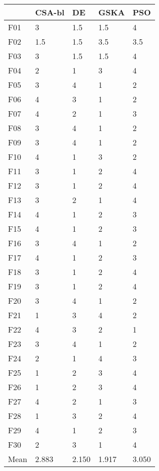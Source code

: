 \begin{tabular}{lllll}
\toprule
{} & CSA-bl &     DE &   GSKA &    PSO \\
\midrule
F01  &      3 &    1.5 &    1.5 &      4 \\
F02  &    1.5 &    1.5 &    3.5 &    3.5 \\
F03  &      3 &    1.5 &    1.5 &      4 \\
F04  &      2 &      1 &      3 &      4 \\
F05  &      3 &      4 &      1 &      2 \\
F06  &      4 &      3 &      1 &      2 \\
F07  &      4 &      2 &      1 &      3 \\
F08  &      3 &      4 &      1 &      2 \\
F09  &      3 &      4 &      1 &      2 \\
F10  &      4 &      1 &      3 &      2 \\
F11  &      3 &      1 &      2 &      4 \\
F12  &      3 &      1 &      2 &      4 \\
F13  &      3 &      2 &      1 &      4 \\
F14  &      4 &      1 &      2 &      3 \\
F15  &      4 &      1 &      2 &      3 \\
F16  &      3 &      4 &      1 &      2 \\
F17  &      4 &      1 &      2 &      3 \\
F18  &      3 &      1 &      2 &      4 \\
F19  &      3 &      1 &      2 &      4 \\
F20  &      3 &      4 &      1 &      2 \\
F21  &      1 &      3 &      4 &      2 \\
F22  &      4 &      3 &      2 &      1 \\
F23  &      3 &      4 &      1 &      2 \\
F24  &      2 &      1 &      4 &      3 \\
F25  &      1 &      2 &      3 &      4 \\
F26  &      1 &      2 &      3 &      4 \\
F27  &      4 &      2 &      1 &      3 \\
F28  &      1 &      3 &      2 &      4 \\
F29  &      4 &      1 &      2 &      3 \\
F30  &      2 &      3 &      1 &      4 \\
Mean &  2.883 &  2.150 &  1.917 &  3.050 \\
\bottomrule
\end{tabular}
